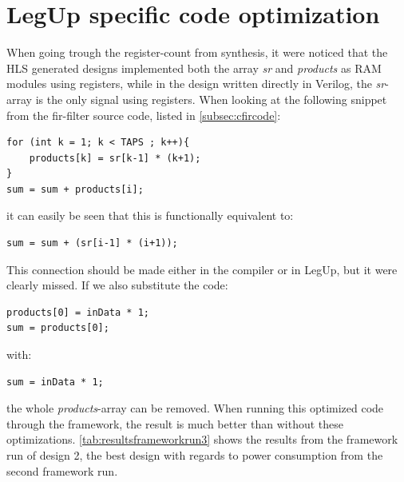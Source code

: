 \section{\label{sec:codeoptimization}LegUp specific code optimization}

When going trough the register-count from synthesis, it were noticed that the HLS generated designs implemented both the array \textit{sr} and \textit{products} as RAM modules using registers, while in the design written directly in Verilog, the \textit{sr}-array is the only signal using registers. When looking at the following snippet from the \gls{fir}-filter source code, listed in \cref{subsec:cfircode}:
\lstset{language=C,style=CStyle}
\begin{lstlisting}
for (int k = 1; k < TAPS ; k++){
    products[k] = sr[k-1] * (k+1);
}
sum = sum + products[i];
\end{lstlisting}
it can easily be seen that this is functionally equivalent to:
\begin{lstlisting}
sum = sum + (sr[i-1] * (i+1));
\end{lstlisting}
This connection should be made either in the compiler or in LegUp, but it were clearly missed. If we also substitute the code:
\begin{lstlisting}
products[0] = inData * 1;
sum = products[0];
\end{lstlisting}
with:
\begin{lstlisting}
sum = inData * 1;
\end{lstlisting}
the whole \textit{products}-array can be removed. When running this optimized code through the framework, the result is much better than without these optimizations. \cref{tab:resultsframeworkrun3} shows the results from the framework run of design 2, the best design with regards to power consumption from the second framework run.

